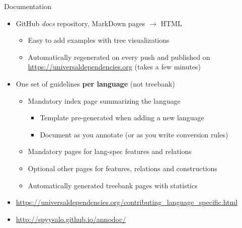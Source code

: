 \documentclass[10pt, compress, aspectratio=169]{beamer}
\begin{document}
\begin{frame}{Documentation}
  \begin{itemize}
    \item GitHub \emph{docs} repository, MarkDown pages $\rightarrow$ HTML
      \begin{itemize}
        \item Easy to add examples with tree visualizations
        \item Automatically regenerated on every push and published on
            \url{https://universaldependencies.org} (takes a few minutes)
      \end{itemize}
    \item One set of guidelines \textbf{per language} (not treebank)
      \begin{itemize}
        \item \alert{Mandatory} index page summarizing the language
          \begin{itemize}
            \item Template pre-generated when adding a new language
            \item Document as you annotate (or as you write conversion
                rules)
          \end{itemize}
        \item \alert{Mandatory} pages for lang-spec features and
            relations
        \item Optional other pages for features, relations and
            constructions
        \item Automatically generated treebank pages with statistics
      \end{itemize}
    \item
        \url{https://universaldependencies.org/contributing_language_specific.html}
    \item \url{http://spyysalo.github.io/annodoc/}
  \end{itemize}
\end{frame}
\end{document}
